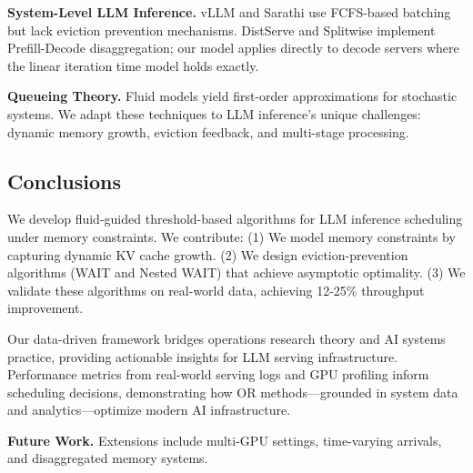 \textbf{System-Level LLM Inference.} vLLM \cite{kwon2023efficient} and Sarathi \cite{agrawal2023sarathi} use FCFS-based batching but lack eviction prevention mechanisms. DistServe \cite{zhong2024distserve} and Splitwise \cite{patel2024splitwise} implement Prefill-Decode disaggregation; our model applies directly to decode servers where the linear iteration time model holds exactly.

\textbf{Queueing Theory.} Fluid models \cite{mandelbaum1998strong, maglaras2000discrete} yield first-order approximations for stochastic systems. We adapt these techniques to LLM inference's unique challenges: dynamic memory growth, eviction feedback, and multi-stage processing.

\subsection{Conclusions}

We develop fluid-guided threshold-based algorithms for LLM inference scheduling under memory constraints. We contribute: (1) We model memory constraints by capturing dynamic KV cache growth. (2) We design eviction-prevention algorithms (WAIT and Nested WAIT) that achieve asymptotic optimality. (3) We validate these algorithms on real-world data, achieving 12-25\% throughput improvement.

Our data-driven framework bridges operations research theory and AI systems practice, providing actionable insights for LLM serving infrastructure. Performance metrics from real-world serving logs and GPU profiling inform scheduling decisions, demonstrating how OR methods—grounded in system data and analytics—optimize modern AI infrastructure.

\textbf{Future Work.} Extensions include multi-GPU settings, time-varying arrivals, and disaggregated memory systems.






